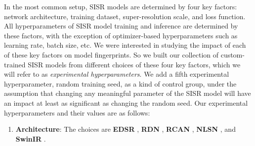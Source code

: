 \documentclass[10pt]{article} %
\begin{document}
In the most common setup, SISR models are determined by four key factors: network architecture, training dataset, super-resolution scale, and loss function. All hyperparameters of SISR model training and inference are determined by these factors, with the exception of optimizer-based hyperparameters such as learning rate, batch size, etc. We were interested in studying the impact of each of these key factors on model fingerprints. So we built our collection of custom-trained SISR models from different choices of these four key factors, which we will refer to as \textit{experimental hyperparameters}. We add a fifth experimental hyperparameter, random training seed, as a kind of control group, under the assumption that changing any meaningful parameter of the SISR model will have an impact at least as significant as changing the random seed. Our experimental hyperparameters and their values are as follows: 

\begin{enumerate}
    \item \textbf{Architecture}: The choices are \textbf{EDSR} \citep{lim2017enhanced}, \textbf{RDN} \citep{zhang2018residual}, \textbf{RCAN} \citep{zhang2018image}, \textbf{NLSN} \citep{Mei_2021_CVPR}, and \textbf{SwinIR} \citep{liang2021swinir}.

\end{enumerate}

\end{document}
